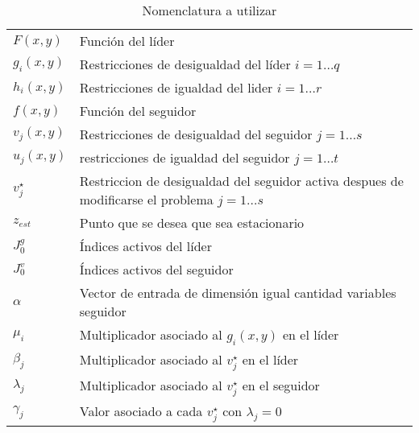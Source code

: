 \begin{table}[H]
    \centering
    \caption{Nomenclatura a utilizar}
    \begin{tabular}{l m{360pt}}
        $ F(x,y) $              & Función del líder                                                                                                          \\
        $ g_i(x,y) $              & Restricciones de desigualdad del líder   $ i=1\ldots q$                                                                                                         \\
        $ h_i(x,y) $                 & Restricciones de igualdad del lider   $ i=1\ldots r$                    \\
        $ f(x,y) $           & Función del seguidor                                                               \\
        $ v_j(x,y) $              &  Restricciones de desigualdad del seguidor $j=1\ldots s$   \\
        $ u_j(x,y) $     & restricciones de igualdad del seguidor $j=1\ldots t$ \\
        $ v_{j}^{\star} $    & Restriccion de desigualdad del seguidor activa despues de modificarse el problema   $j=1\ldots s$          \\
        $z_{est}$         & Punto que se desea que sea estacionario\\
        $J_0^g$             & Índices activos del líder \\
        $J_0^v$                & Índices activos del seguidor \\
        $ \alpha  $             & Vector de entrada de dimensión igual cantidad variables seguidor                                                                                                      \\
        $\mu_i $                & Multiplicador asociado al $g_i(x,y)$ en el líder  \\
        $ \beta_j $               & Multiplicador asociado al $v_{j}^{\star}$ en el líder          \\
        $ \lambda_j $              & Multiplicador asociado al $v_{j}^{\star}$ en el seguidor\\
        $\gamma_j$                & Valor asociado a cada $v_{j}^{\star}$ con $\lambda_j=0$\\
    \end{tabular}

    \end{table}

